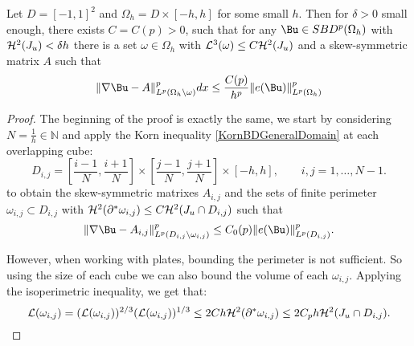     \begin{theorem} Let $D=[-1,1]^2$ and $\Omega_h = D\times[-h,h]$ for some small $h$. Then for $\delta>0$ small enough, there exists $C = C(p)>0$, such that for any $\Bu\in SBD^p(\Omega_h)$ with ${\mathcal H}^2(J_u)<\delta h$ there is a set $\omega\in\Omega_h$ with ${\mathcal L}^3(\omega)\leq C {\mathcal H}^2(J_u)$  and a skew-symmetric matrix $A$ such that
    $$\|\nabla \Bu-A\|^p_{L^p(\Omega_h \backslash \omega)} dx \leq \frac{C(p)}{h^p} \|e(\Bu)\|^p_{L^p(\Omega_h)}$$
    \end{theorem}
    \begin{proof}
    The beginning of the proof is exactly the same, we start by considering  $N = \frac{1}{h}\in \mathbb{N}$ and  apply  the Korn inequality \ref{KornBDGeneralDomain} at each overlapping cube:
    $$D_{i,j}=\left[\frac{i-1}{N},\frac{i+1}{N}\right]\times\left[\frac{j-1}{N},\frac{j+1}{N}\right]\times[-h,h],\qquad i,j=1,\ldots,N-1.$$
    to obtain the skew-symmetric matrixes $A_{i,j}$ and the sets of finite perimeter $\omega_{i,j}\subset D_{i,j}$ with ${\mathcal H}^2(\partial^*\omega_{i,j})\leq C {\mathcal H}^2(J_u\cap D_{i,j})$ such that
    \begin{equation}\label{kornkj}
    \|\nabla \Bu- A_{i,j}\|^p_{L^p(D_{i,j}\backslash \omega_{i,j})} \leq C_0(p) \|e(\Bu)\|^p_{L^p(D_{i,j})}.
    \end{equation}

    However, when working with plates, bounding the perimeter is not sufficient. So using the size of each cube we can also bound the volume of each $\omega_{i,j}$. Applying the isoperimetric inequality, we get that:
    $${\mathcal L}(\omega_{i,j})=({\mathcal L}(\omega_{i,j}))^{2/3}({\mathcal L}(\omega_{i,j}))^{1/3}\leq 2Ch {\mathcal H}^2(\partial^*\omega_{i,j})\leq 2C_ph{\mathcal H}^2(J_u\cap D_{i,j}).$$



\end{proof}
